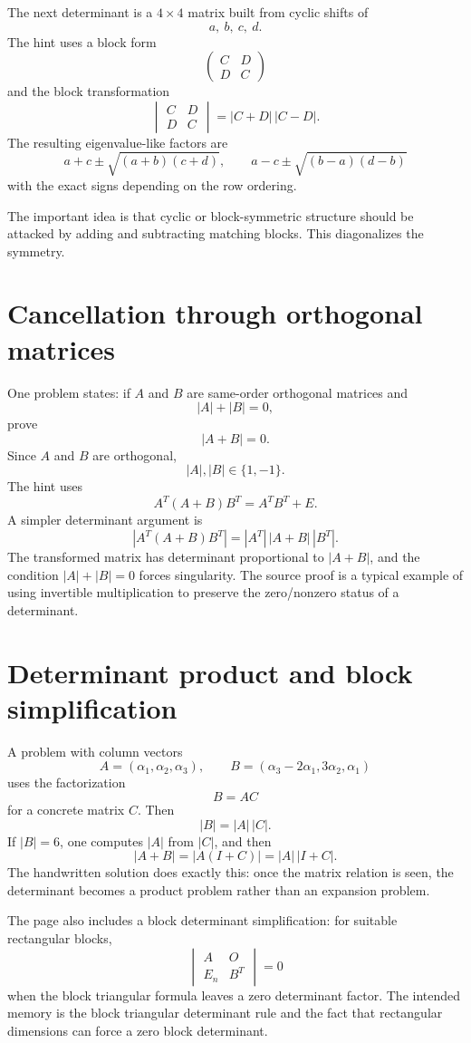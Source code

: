 The next determinant is a $4\times4$ matrix built from cyclic shifts of
\[
  a,\ b,\ c,\ d.
\]
The hint uses a block form
\[
  \begin{pmatrix}C&D\\D&C\end{pmatrix}
\]
and the block transformation
\[
  \begin{vmatrix}C&D\\D&C\end{vmatrix}
  =
  |C+D|\,|C-D|.
\]
The resulting eigenvalue-like factors are
\[
  a+c\pm\sqrt{(a+b)(c+d)},\qquad
  a-c\pm\sqrt{(b-a)(d-b)}
\]
with the exact signs depending on the row ordering.

The important idea is that cyclic or block-symmetric structure should be attacked by adding and subtracting matching blocks.  This diagonalizes the symmetry.

\section{Cancellation through orthogonal matrices}

One problem states: if $A$ and $B$ are same-order orthogonal matrices and
\[
  |A|+|B|=0,
\]
prove
\[
  |A+B|=0.
\]
Since $A$ and $B$ are orthogonal,
\[
  |A|,|B|\in\{1,-1\}.
\]
The hint uses
\[
  A^T(A+B)B^T=A^TB^T+E.
\]
A simpler determinant argument is
\[
  |A^T(A+B)B^T|=|A^T|\,|A+B|\,|B^T|.
\]
The transformed matrix has determinant proportional to $|A+B|$, and the condition $|A|+|B|=0$ forces singularity.  The source proof is a typical example of using invertible multiplication to preserve the zero/nonzero status of a determinant.

\section{Determinant product and block simplification}

A problem with column vectors
\[
  A=(\alpha_1,\alpha_2,\alpha_3),\qquad
  B=(\alpha_3-2\alpha_1,3\alpha_2,\alpha_1)
\]
uses the factorization
\[
  B=AC
\]
for a concrete matrix $C$.  Then
\[
  |B|=|A|\,|C|.
\]
If $|B|=6$, one computes $|A|$ from $|C|$, and then
\[
  |A+B|=|A(I+C)|=|A|\,|I+C|.
\]
The handwritten solution does exactly this: once the matrix relation is seen, the determinant becomes a product problem rather than an expansion problem.

The page also includes a block determinant simplification: for suitable rectangular blocks,
\[
  \begin{vmatrix}A&O\\E_n&B^T\end{vmatrix}=0
\]
when the block triangular formula leaves a zero determinant factor.  The intended memory is the block triangular determinant rule and the fact that rectangular dimensions can force a zero block determinant.

